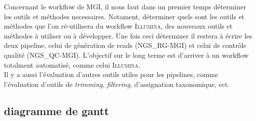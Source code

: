 Concernant le workflow de \textsc{MGI}, il nous faut dans un premier temps déterminer les outils et méthodes necessaires. Notament, déterminer quels sont les outils et méthodes que l'on ré-utilisera du workflow \textsc{Illumina}, des nouveaux outils et méthodes à utiliser ou à développer. Une fois ceci déterminer il restera à écrire les deux pipeline, celui de génération de reads (\textsc{NGS\_RG-MGI}) et celui de contrôle qualité (\textsc{NGS\_QC-MGI}). L'objectif sur le long terme est d'arriver à un workflow totalment automatisé, comme celui \textsc{Illumina}.\\

Il y a aussi l'évaluation d'autres outils utiles pour les pipelines, comme l'évaluation d'outils de \emph{trimming}, \emph{filtering}, d'assignation taxonomique, ect.
\subsection{diagramme de gantt}
